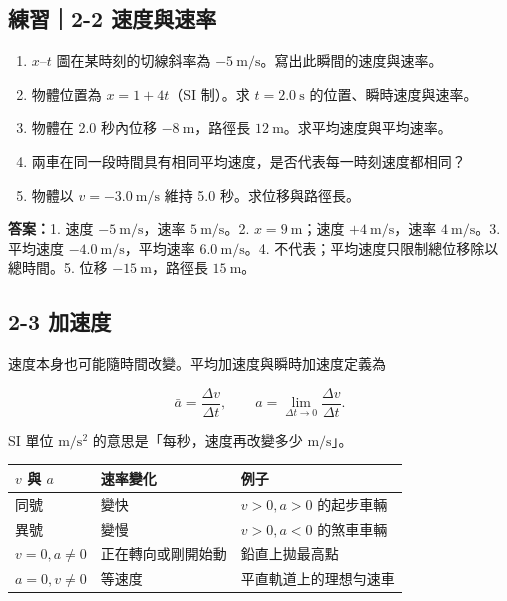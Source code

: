\documentclass[11pt,a4paper]{article}
\newcounter{none}
\providecommand{\tightlist}{%
  \setlength{\itemsep}{0pt}\setlength{\parskip}{0pt}}
\begin{document}
\begin{HandoutSelfCheck}

\subsection{練習｜2-2 速度與速率}\label{ux7df4ux7fd22-2-ux901fux5ea6ux8207ux901fux7387}

\begin{enumerate}
\def\labelenumi{\arabic{enumi}.}
\tightlist
\item
  \(x\text{–}t\) 圖在某時刻的切線斜率為 \(-5\ \mathrm{m/s}\)。寫出此瞬間的速度與速率。
\item
  物體位置為 \(x=1+4t\)（SI 制）。求 \(t=2.0\ \mathrm s\) 的位置、瞬時速度與速率。
\item
  物體在 2.0 秒內位移 \(-8\ \mathrm m\)，路徑長 \(12\ \mathrm m\)。求平均速度與平均速率。
\item
  兩車在同一段時間具有相同平均速度，是否代表每一時刻速度都相同？
\item
  物體以 \(v=-3.0\ \mathrm{m/s}\) 維持 5.0 秒。求位移與路徑長。
\end{enumerate}

\textbf{答案：}1. 速度 \(-5\ \mathrm{m/s}\)，速率 \(5\ \mathrm{m/s}\)。2. \(x=9\ \mathrm m\)；速度 \(+4\ \mathrm{m/s}\)，速率 \(4\ \mathrm{m/s}\)。3. 平均速度 \(-4.0\ \mathrm{m/s}\)，平均速率 \(6.0\ \mathrm{m/s}\)。4. 不代表；平均速度只限制總位移除以總時間。5. 位移 \(-15\ \mathrm m\)，路徑長 \(15\ \mathrm m\)。

\end{HandoutSelfCheck}

\subsection{2-3 加速度}\label{ux52a0ux901fux5ea6}

速度本身也可能隨時間改變。平均加速度與瞬時加速度定義為

\[
\bar a=\frac{\Delta v}{\Delta t},
\qquad
a=\lim_{\Delta t\to0}\frac{\Delta v}{\Delta t}.
\]

SI 單位 \(\mathrm{m/s^2}\) 的意思是「每秒，速度再改變多少 \(\mathrm{m/s}\)」。

{\def\LTcaptype{none} %
\begin{longtable}[]{@{}lll@{}}
\toprule\noalign{}
\(v\) 與 \(a\) & 速率變化 & 例子 \\
\midrule\noalign{}
\endhead
\bottomrule\noalign{}
\endlastfoot
同號 & 變快 & \(v>0,a>0\) 的起步車輛 \\
異號 & 變慢 & \(v>0,a<0\) 的煞車車輛 \\
\(v=0,a\ne0\) & 正在轉向或剛開始動 & 鉛直上拋最高點 \\
\(a=0,v\ne0\) & 等速度 & 平直軌道上的理想勻速車 \\
\end{longtable}
}
\end{document}
